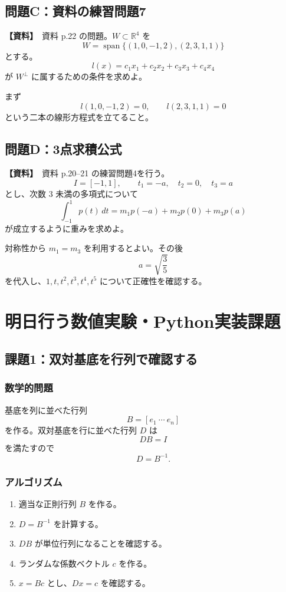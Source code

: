 \documentclass[a4paper,11pt]{ltjsarticle}
\newcommand{\R}{\mathbb{R}}
\newcommand{\Span}{\operatorname{span}}
\newcommand{\sourceitem}{\textbf{【資料】}}
\begin{document}
\subsection{問題C：資料の練習問題7}
\sourceitem\ 資料 p.22 の問題。$W\subset\R^4$ を
\[
W=\Span\{(1,0,-1,2),(2,3,1,1)\}
\]
とする。
\[
l(x)=c_1x_1+c_2x_2+c_3x_3+c_4x_4
\]
が $W^\perp$ に属するための条件を求めよ。

まず
\[
l(1,0,-1,2)=0,
\qquad
l(2,3,1,1)=0
\]
という二本の線形方程式を立てること。

\subsection{問題D：3点求積公式}
\sourceitem\ 資料 p.20--21 の練習問題4を行う。
\[
I=[-1,1],\qquad t_1=-a,\quad t_2=0,\quad t_3=a
\]
とし、次数 $3$ 未満の多項式について
\[
\int_{-1}^{1}p(t)\,dt
=m_1p(-a)+m_2p(0)+m_3p(a)
\]
が成立するように重みを求めよ。

対称性から $m_1=m_3$ を利用するとよい。その後
\[
a=\sqrt{\frac35}
\]
を代入し、$1,t,t^2,t^3,t^4,t^5$ について正確性を確認する。

\section{明日行う数値実験・Python実装課題}

\subsection{課題1：双対基底を行列で確認する}

\subsubsection*{数学的問題}
基底を列に並べた行列
\[
B=[e_1\ \cdots\ e_n]
\]
を作る。双対基底を行に並べた行列 $D$ は
\[
DB=I
\]
を満たすので
\[
D=B^{-1}.
\]

\subsubsection*{アルゴリズム}
\begin{enumerate}
  \item 適当な正則行列 $B$ を作る。
  \item $D=B^{-1}$ を計算する。
  \item $DB$ が単位行列になることを確認する。
  \item ランダムな係数ベクトル $c$ を作る。
  \item $x=Bc$ とし、$Dx=c$ を確認する。
\end{enumerate}
\end{document}
